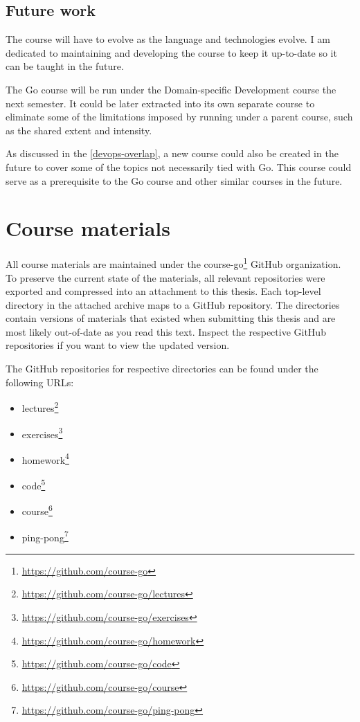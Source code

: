 \documentclass[
  digital,
  color,
  oneside,
  nosansbold,
  nocolorbold,
  nolof,
  nolot,
]{fithesis4}
\begin{document}
\section{Future work}

The course will have to evolve as the language and technologies evolve. I am dedicated to maintaining and developing the course to keep it up-to-date so it can be taught in the future.

The Go course will be run under the Domain-specific Development course the next semester. It could be later extracted into its own separate course to eliminate some of the limitations imposed by running under a parent course, such as the shared extent and intensity.

As discussed in the \cref{devops-overlap}, a new course could also be created in the future to cover some of the topics not necessarily tied with Go. This course could serve as a prerequisite to the Go course and other similar courses in the future.

\printbibliography[heading=bibintoc]

\appendix
\chapter{Course materials}\label{apendix-materials}

All course materials are maintained under the course-go\footnote{\url{https://github.com/course-go}} GitHub organization. To preserve the current state of the materials, all relevant repositories were exported and compressed into an attachment to this thesis. Each top-level directory in the attached archive maps to a GitHub repository. The directories contain versions of materials that existed when submitting this thesis and are most likely out-of-date as you read this text. Inspect the respective GitHub repositories if you want to view the updated version.

The GitHub repositories for respective directories can be found under the following URLs:
\begin{itemize}
    \item lectures\footnote{\url{https://github.com/course-go/lectures}}
    \item exercises\footnote{\url{https://github.com/course-go/exercises}}
    \item homework\footnote{\url{https://github.com/course-go/homework}}
    \item code\footnote{\url{https://github.com/course-go/code}}
    \item course\footnote{\url{https://github.com/course-go/course}}
    \item ping-pong\footnote{\url{https://github.com/course-go/ping-pong}}
\end{itemize}
\end{document}
